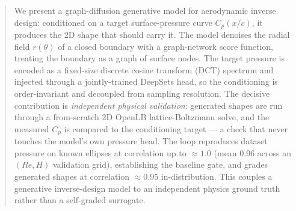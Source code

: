 \begin{abstract}
We present a graph-diffusion generative model for aerodynamic inverse design: conditioned on a
target surface-pressure curve $C_p(x/c)$, it produces the 2D shape that should carry it. The model
denoises the radial field $r(\theta)$ of a closed boundary with a graph-network score function,
treating the boundary as a graph of surface nodes. The target pressure is encoded as a fixed-size
discrete cosine transform (DCT) spectrum and injected through a jointly-trained DeepSets head, so
the conditioning is order-invariant and decoupled from sampling resolution. The decisive
contribution is \emph{independent physical validation}: generated shapes are run through a
from-scratch 2D OpenLB lattice-Boltzmann solve, and the measured $C_p$ is compared to the
conditioning target --- a check that never touches the model's own pressure head. The loop
reproduces dataset pressure on known ellipses at correlation up to $\approx 1.0$ (mean 0.96 across an
$(Re, H)$ validation grid), establishing the baseline gate, and grades generated shapes at correlation
$\approx 0.95$ in-distribution. This couples a
generative inverse-design model to an independent physics ground truth rather than a self-graded
surrogate.
\end{abstract}

